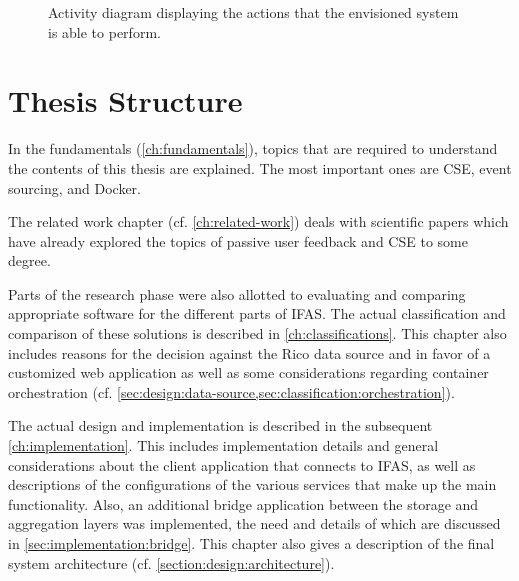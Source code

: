 \begin{figure}[ht]
        \caption{Activity diagram displaying the actions that the envisioned system is able to perform.}
        \label{fig:system:vision}
\end{figure}


\section{Thesis Structure}
\label{sec:intro:structure}

In the fundamentals (\cref{ch:fundamentals}), topics that are required to understand the contents of this thesis are explained.
The most important ones are \acf{CSE}, event sourcing, and Docker.

The related work chapter (cf. \cref{ch:related-work}) deals with scientific papers which have already explored the topics of passive user feedback and \ac{CSE} to some degree.

Parts of the research phase were also allotted to evaluating and comparing appropriate software for the different parts of \ac{IFAS}.
The actual classification and comparison of these solutions is described in \cref{ch:classifications}.
This chapter also includes reasons for the decision against the Rico data source and in favor of a customized web application as well as some considerations regarding container orchestration (cf. \cref{sec:design:data-source,sec:classification:orchestration}).

The actual design and implementation is described in the subsequent \cref{ch:implementation}.
This includes implementation details and general considerations about the client application that connects to \ac{IFAS}, as well as descriptions of the configurations of the various services that make up the main functionality.
Also, an additional bridge application between the storage and aggregation layers was implemented, the need and details of which are discussed in \cref{sec:implementation:bridge}.
This chapter also gives a description of the final system architecture (cf. \cref{section:design:architecture}).

